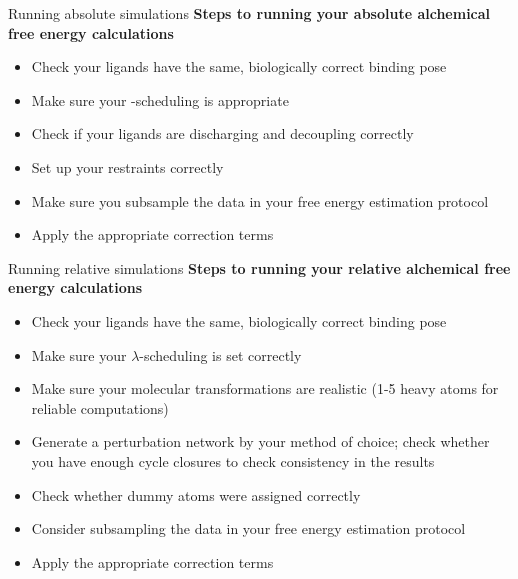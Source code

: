 \documentclass[9pt,bestpractices,pubversion]{livecoms}
\begin{document}
\begin{Checklists*}
\begin{checklist}{Running absolute simulations}
        \textbf{Steps to running your absolute alchemical free energy calculations}
\begin{itemize}
 \item Check your ligands have the same, biologically correct binding pose
        \item Make sure your \textlambda-scheduling is  appropriate
        \item Check if your ligands are discharging and decoupling correctly
        \item Set up your restraints correctly
        \item Make sure you subsample the data in your free energy estimation protocol
        \item Apply the appropriate correction terms
\end{itemize}
\end{checklist}

\begin{checklist}{Running relative simulations}
        \textbf{Steps to running your relative alchemical free energy calculations}
\begin{itemize}
   \item Check your ligands  have the same, biologically correct binding pose
        \item Make sure your $\lambda$-scheduling is set correctly
        \item Make sure your molecular transformations are realistic (1-5 heavy atoms for reliable computations)
        \item Generate a perturbation network by your method of choice; check whether you have enough cycle closures to check consistency in the results
        \item Check whether dummy atoms were assigned correctly
        \item Consider subsampling the data in your free energy estimation protocol
        \item Apply the 
        appropriate correction terms
\end{itemize}
\end{checklist}
\end{Checklists*}
\end{document}
